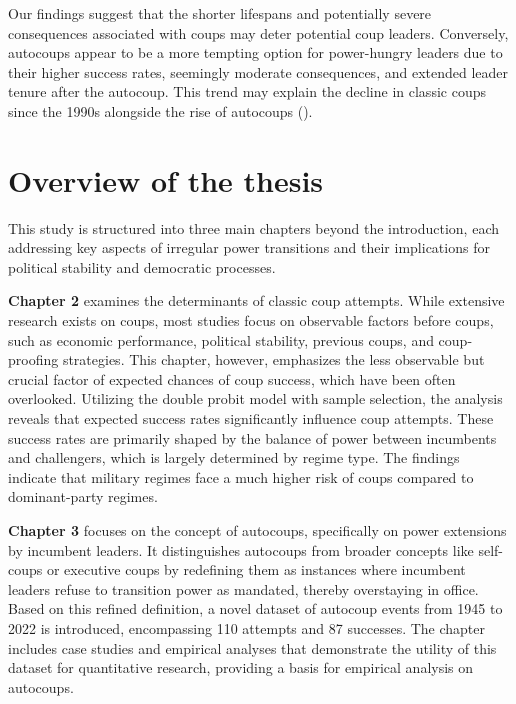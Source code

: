 \documentclass[
  12pt,
]{report}
\begin{document}
Our findings suggest that the shorter lifespans and potentially severe
consequences associated with coups may deter potential coup leaders.
Conversely, autocoups appear to be a more tempting option for
power-hungry leaders due to their higher success rates, seemingly
moderate consequences, and extended leader tenure after the autocoup.
This trend may explain the decline in classic coups since the 1990s
alongside the rise of autocoups ().

\section{Overview of the thesis}\label{overview-of-the-thesis}

This study is structured into three main chapters beyond the
introduction, each addressing key aspects of irregular power transitions
and their implications for political stability and democratic processes.

\textbf{Chapter 2} examines the determinants of classic coup attempts.
While extensive research exists on coups, most studies focus on
observable factors before coups, such as economic performance, political
stability, previous coups, and coup-proofing strategies. This chapter,
however, emphasizes the less observable but crucial factor of expected
chances of coup success, which have been often overlooked. Utilizing the
double probit model with sample selection, the analysis reveals that
expected success rates significantly influence coup attempts. These
success rates are primarily shaped by the balance of power between
incumbents and challengers, which is largely determined by regime type.
The findings indicate that military regimes face a much higher risk of
coups compared to dominant-party regimes.

\textbf{Chapter 3} focuses on the concept of autocoups, specifically on
power extensions by incumbent leaders. It distinguishes autocoups from
broader concepts like self-coups or executive coups by redefining them
as instances where incumbent leaders refuse to transition power as
mandated, thereby overstaying in office. Based on this refined
definition, a novel dataset of autocoup events from 1945 to 2022 is
introduced, encompassing 110 attempts and 87 successes. The chapter
includes case studies and empirical analyses that demonstrate the
utility of this dataset for quantitative research, providing a basis for
empirical analysis on autocoups.
\end{document}
